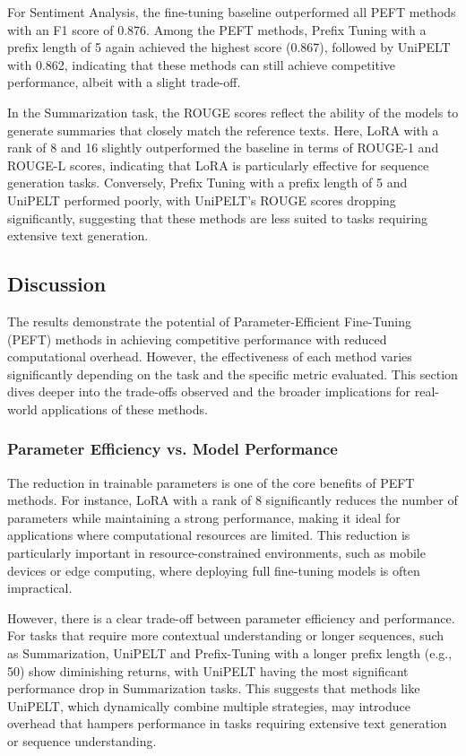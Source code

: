For Sentiment Analysis, the fine-tuning baseline outperformed all PEFT methods with an F1 score of 0.876. Among the PEFT methods, Prefix Tuning with a prefix length of 5 again achieved the highest score (0.867), followed by UniPELT with 0.862, indicating that these methods can still achieve competitive performance, albeit with a slight trade-off.

In the Summarization task, the ROUGE scores reflect the ability of the models to generate summaries that closely match the reference texts. Here, LoRA with a rank of 8 and 16 slightly outperformed the baseline in terms of ROUGE-1 and ROUGE-L scores, indicating that LoRA is particularly effective for sequence generation tasks. Conversely, Prefix Tuning with a prefix length of 5 and UniPELT performed poorly, with UniPELT's ROUGE scores dropping significantly, suggesting that these methods are less suited to tasks requiring extensive text generation.

\subsection{Discussion}

The results demonstrate the potential of Parameter-Efficient Fine-Tuning (PEFT) methods in achieving competitive performance with reduced computational overhead. However, the effectiveness of each method varies significantly depending on the task and the specific metric evaluated. This section dives deeper into the trade-offs observed and the broader implications for real-world applications of these methods.

\subsubsection{\textbf{Parameter Efficiency vs. Model Performance}}
The reduction in trainable parameters is one of the core benefits of PEFT methods. For instance, LoRA with a rank of 8 significantly reduces the number of parameters while maintaining a strong performance, making it ideal for applications where computational resources are limited. This reduction is particularly important in resource-constrained environments, such as mobile devices or edge computing, where deploying full fine-tuning models is often impractical.

However, there is a clear trade-off between parameter efficiency and performance. For tasks that require more contextual understanding or longer sequences, such as Summarization, UniPELT and Prefix-Tuning with a longer prefix length (e.g., 50) show diminishing returns, with UniPELT having the most significant performance drop in Summarization tasks. This suggests that methods like UniPELT, which dynamically combine multiple strategies, may introduce overhead that hampers performance in tasks requiring extensive text generation or sequence understanding.

